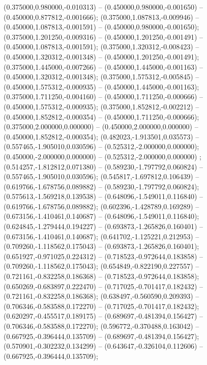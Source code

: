  (0.375000,0.980000,-0.010313) -- (0.450000,0.980000,-0.001650) -- (0.450000,0.877812,-0.001666);
 (0.375000,1.087813,-0.009946) -- (0.450000,1.087813,-0.001591) -- (0.450000,0.980000,-0.001650);
 (0.375000,1.201250,-0.009316) -- (0.450000,1.201250,-0.001491) -- (0.450000,1.087813,-0.001591);
 (0.375000,1.320312,-0.008423) -- (0.450000,1.320312,-0.001348) -- (0.450000,1.201250,-0.001491);
 (0.375000,1.445000,-0.007266) -- (0.450000,1.445000,-0.001163) -- (0.450000,1.320312,-0.001348);
 (0.375000,1.575312,-0.005845) -- (0.450000,1.575312,-0.000935) -- (0.450000,1.445000,-0.001163);
 (0.375000,1.711250,-0.004160) -- (0.450000,1.711250,-0.000666) -- (0.450000,1.575312,-0.000935);
 (0.375000,1.852812,-0.002212) -- (0.450000,1.852812,-0.000354) -- (0.450000,1.711250,-0.000666);
 (0.375000,2.000000,0.000000) -- (0.450000,2.000000,0.000000) -- (0.450000,1.852812,-0.000354);
 (0.482023,-1.913501,0.035573) -- (0.557465,-1.905010,0.030596) -- (0.525312,-2.000000,0.000000);
 (0.450000,-2.000000,0.000000) -- (0.525312,-2.000000,0.000000) ;
 (0.514257,-1.812812,0.071380) -- (0.589230,-1.797792,0.060824) -- (0.557465,-1.905010,0.030596);
 (0.545817,-1.697812,0.106439) -- (0.619766,-1.678756,0.089882) -- (0.589230,-1.797792,0.060824);
 (0.575613,-1.569218,0.139538) -- (0.648096,-1.549011,0.116840) -- (0.619766,-1.678756,0.089882);
 (0.602396,-1.428789,0.169289) -- (0.673156,-1.410461,0.140687) -- (0.648096,-1.549011,0.116840);
 (0.624845,-1.279444,0.194227) -- (0.693873,-1.265826,0.160401) -- (0.673156,-1.410461,0.140687);
 (0.641702,-1.125221,0.212953) -- (0.709260,-1.118562,0.175043) -- (0.693873,-1.265826,0.160401);
 (0.651927,-0.971025,0.224312) -- (0.718523,-0.972644,0.183858) -- (0.709260,-1.118562,0.175043);
 (0.654849,-0.822190,0.227557) -- (0.721161,-0.832258,0.186368) -- (0.718523,-0.972644,0.183858);
 (0.650269,-0.683897,0.222470) -- (0.717025,-0.701417,0.182432) -- (0.721161,-0.832258,0.186368);
 (0.638497,-0.560590,0.209393) -- (0.706346,-0.583588,0.172270) -- (0.717025,-0.701417,0.182432);
 (0.620297,-0.455517,0.189175) -- (0.689697,-0.481394,0.156427) -- (0.706346,-0.583588,0.172270);
 (0.596772,-0.370488,0.163042) -- (0.667925,-0.396444,0.135709) -- (0.689697,-0.481394,0.156427);
 (0.570901,-0.302232,0.134299) -- (0.643647,-0.326104,0.112606) -- (0.667925,-0.396444,0.135709);
